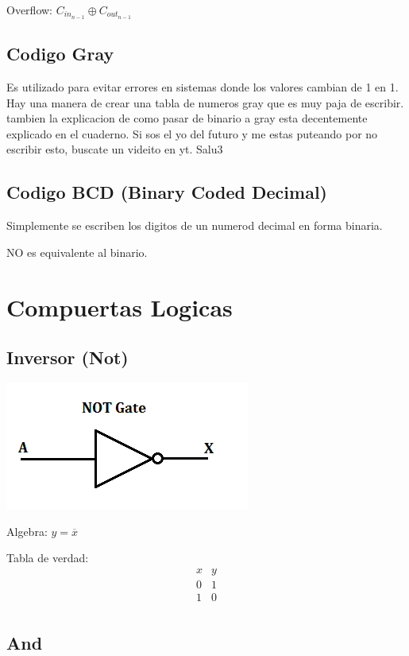 \documentclass{report}
\begin{document}
Overflow: $C_{in_{n-1}} \oplus C_{out_{n-1}}$

\section{Codigo Gray}

Es utilizado para evitar errores en sistemas donde los valores cambian de 1 en 1.
Hay una manera de crear una tabla de numeros gray que es muy paja de escribir.
tambien la explicacion de como pasar de binario a gray esta decentemente explicado en el cuaderno.
Si sos el yo del futuro y me estas puteando por no escribir esto, buscate un videito en yt. Salu3


\section{Codigo BCD (Binary Coded Decimal)}

Simplemente se escriben los digitos de un numerod decimal en forma binaria.

NO es equivalente al binario.
\chapter{Compuertas Logicas}

\section{Inversor (Not)}
\includegraphics{../Assets/not_gate.png}

Algebra: $y=\overline x$

Tabla de verdad:
$$\begin{array}{c|c}
		x & y \\ \hline
		0 & 1 \\
		1 & 0 \\
	\end{array}$$

\section{And}
\end{document}
